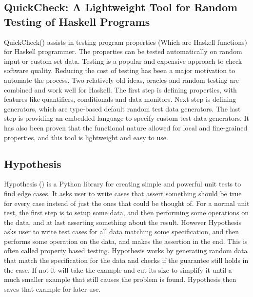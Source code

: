 \documentclass[preprint,nocopyrightspace]{sig-alternate}
\begin{document}
\subsection{QuickCheck: A Lightweight Tool for Random Testing of Haskell Programs}
QuickCheck(\citet{claessen_quickcheck:_2011}) assists in testing program properties (Which are Haskell functions) for Haskell programmer.
The properties can be tested automatically on random input or custom set data.
Testing is a popular and expensive approach to check software quality.
Reducing the cost of testing has been a major motivation to automate the process.
Two relatively old ideas, oracles and random testing are combined and work well for Haskell.
The first step is defining properties, with features like quantifiers, conditionals and data monitors.
Next step is defining generators, which are type-based default random test data generators.
The last step is providing an embedded language to specify custom test data generators.
It has also been proven that the functional nature allowed for local and fine-grained properties,
and this tool is lightweight and easy to use.

\subsection{Hypothesis}
Hypothesis (\citet{maciver_welcome_2015}) is a Python library for creating simple and powerful unit tests to find edge cases.
It asks user to write cases that assert something should be true for every case instead of just the ones that could be thought of.
For a normal unit test,
the first step is to setup some data,
and then performing some operations on the data,
and at last asserting something about the result.
However Hypothesis asks user to write test cases for all data matching some specification,
and then performs some operation on the data,
and makes the assertion in the end.
This is often called property based testing.
Hypothesis works by generating random data that match the specification for the data and checks if the guarantee still holds in the case.
If not it will take the example and cut its size to simplify it until a much smaller example that still causes the problem is found.
Hypothesis then saves that example for later use.
\end{document}
